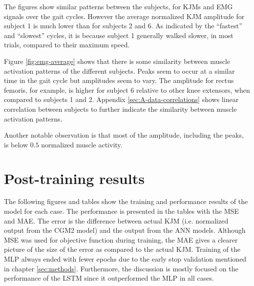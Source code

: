 \documentclass[../main.tex]{subfiles}
\begin{document}
The figures show similar patterns between the subjects, for \acp{KJM} and \ac{EMG} signals over the gait cycles.
However the average normalized \ac{KJM} amplitude for subject 1 is much lower than for subjects 2 and 6.
As indicated by the ``fastest'' and ``slowest'' cycles, it is because subject 1 generally walked slower, in most trials, compared to their maximum speed.

% 
Figure \ref{fig:emg-average} shows that there is some similarity between muscle activation patterns of the different subjects. 
Peaks seem to occur at a similar time in the gait cycle but amplitudes seem to vary.
The amplitude for rectus femoris, for example, is higher for subject 6 relative to other knee extensors, when compared to subjects 1 and 2.
Appendix \ref{sec:A-data-correlations} shows linear correlation between subjects to further indicate the similarity between muscle activation patterns.

Another notable observation is that most of the amplitude, including the peaks, is below $0.5$ normalized muscle activity.


\section{Post-training results}
\label{sec:post-training-results}
The following figures and tables show the training and performance results of the model for each case.
The performance is presented in the tables with the \ac{MSE} and \ac{MAE}.
The error is the difference between actual \ac{KJM} (i.e. normalized output from the CGM2 model) and the output from the \ac{ANN} models.
Although \ac{MSE} was used for objective function during training, the \ac{MAE} gives a clearer picture of the size of the error as compared to the actual \ac{KJM}.
Training of the \ac{MLP} always ended with fewer epochs due to the early stop validation mentioned in chapter \ref{sec:methods}.
Furthermore, the discussion is mostly focused on the performance of the \ac{LSTM} since it outperformed the \ac{MLP} in all cases.
\end{document}
